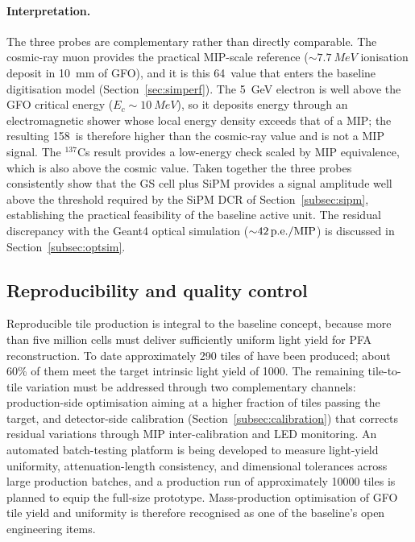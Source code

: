 \paragraph{Interpretation.}
The three probes are complementary rather than directly comparable.
The cosmic-ray muon provides the practical MIP-scale reference
(${\sim}\SI{7.7}{MeV}$ ionisation deposit in \SI{10}{mm} of GFO),
and it is this 64~\peMIP value that enters the baseline digitisation
model (Section~\ref{sec:simperf}).
The \SI{5}{GeV} electron is well above the GFO critical energy
($E_{c}\sim\SI{10}{MeV}$), so it deposits energy through an
electromagnetic shower whose local energy density exceeds that of a
MIP; the resulting 158~\peMIP is therefore higher than the
cosmic-ray value and is not a MIP signal.
The $^{137}$Cs result provides a low-energy check scaled by MIP
equivalence, which is also above the cosmic value.
Taken together the three probes consistently show that the GS cell
plus SiPM provides a signal amplitude well above the threshold
required by the SiPM DCR of Section~\ref{subsec:sipm}, establishing
the practical feasibility of the baseline active unit.
The residual discrepancy with the Geant4 optical simulation
(${\sim}\SI{42}{\ensuremath{\text{p.e.}/\text{MIP}}}$) is discussed in
Section~\ref{subsec:optsim}.

\subsection{Reproducibility and quality control}
\label{subsec:qc}

Reproducible tile production is integral to the baseline concept,
because more than five million cells must deliver sufficiently uniform
light yield for PFA reconstruction.
To date approximately 290 tiles of \cellsize have been produced;
about 60\% of them meet the target intrinsic light yield of
\SI{1000}{\phMeV}.
The remaining tile-to-tile variation must be addressed through
two complementary channels: production-side optimisation aiming at a
higher fraction of tiles passing the target, and detector-side
calibration (Section~\ref{subsec:calibration}) that corrects residual
variations through MIP inter-calibration and LED monitoring.
An automated batch-testing platform is being developed to measure
light-yield uniformity, attenuation-length consistency, and
dimensional tolerances across large production batches, and a
production run of approximately \num{10000} tiles is planned to equip
the full-size prototype.
Mass-production optimisation of GFO tile yield and uniformity is
therefore recognised as one of the baseline's open engineering
items.

